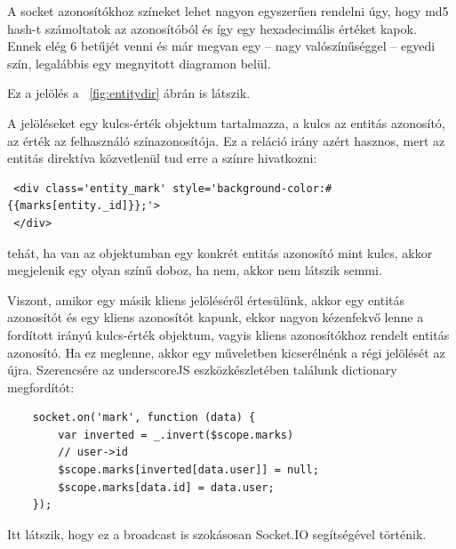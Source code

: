 A socket azonosítókhoz színeket lehet nagyon egyszerűen rendelni úgy, hogy md5 hash-t számoltatok az azonosítóból és így egy hexadecimális értéket kapok. Ennek elég 6 betűjét venni és már megvan egy -- nagy valószínűséggel -- egyedi szín, legalábbis egy megnyitott diagramon belül.

Ez a jelölés a ~\ref{fig:entitydir} ábrán is látszik. 

A jelöléseket egy kulcs-érték objektum tartalmazza, a kulcs az entitás azonosító, az érték az felhasználó színazonosítója. Ez a reláció irány azért hasznos, mert az entitás direktíva közvetlenül tud erre a színre hivatkozni:

\begin{lstlisting}
 <div class='entity_mark' style='background-color:#{{marks[entity._id]}};'>
 </div>
\end{lstlisting} 

tehát, ha van az objektumban egy konkrét entitás azonosító mint kulcs, akkor megjelenik egy olyan színű doboz, ha nem, akkor nem látszik semmi. 

Viszont, amikor egy másik kliens jelöléséről értesülünk, akkor egy entitás azonosítót és egy kliens azonosítót kapunk, ekkor nagyon kézenfekvő lenne a fordított irányú kulcs-érték objektum, vagyis kliens azonosítókhoz rendelt entitás azonosító. Ha ez meglenne, akkor egy műveletben kicserélnénk a régi jelölését az újra. Szerencsére az underscoreJS eszközkészletében találunk dictionary megfordítót:

\begin{lstlisting}
    socket.on('mark', function (data) {
        var inverted = _.invert($scope.marks)
        // user->id
        $scope.marks[inverted[data.user]] = null;
        $scope.marks[data.id] = data.user;
    });
\end{lstlisting}

Itt látszik, hogy ez a broadcast is szokásosan Socket.IO segítségével történik.